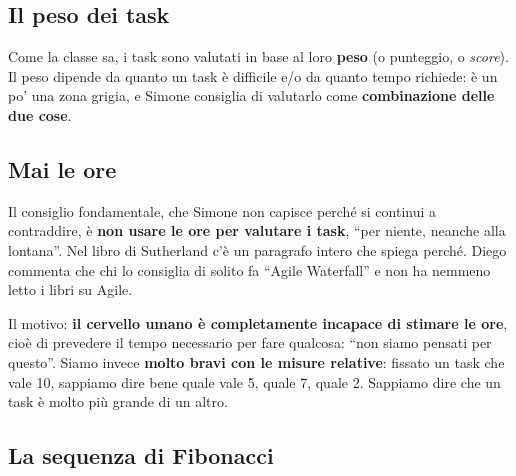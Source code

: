 \subsection{Il peso dei task}

Come la classe sa, i task sono valutati in base al loro \textbf{peso} (o
punteggio, o \emph{score}). Il peso dipende da quanto un task è difficile e/o
da quanto tempo richiede: è un po' una zona grigia, e Simone consiglia di
valutarlo come \textbf{combinazione delle due cose}.

\subsection{Mai le ore}

Il consiglio fondamentale, che Simone non capisce perché si continui a
contraddire, è \textbf{non usare le ore per valutare i task}, ``per niente,
neanche alla lontana''. Nel libro di Sutherland c'è un paragrafo intero che
spiega perché. Diego commenta che chi lo consiglia di solito fa ``Agile
Waterfall'' e non ha nemmeno letto i libri su Agile.

Il motivo: \textbf{il cervello umano è completamente incapace di stimare le
ore}, cioè di prevedere il tempo necessario per fare qualcosa: ``non siamo
pensati per questo''. Siamo invece \textbf{molto bravi con le misure
relative}: fissato un task che vale 10, sappiamo dire bene quale vale 5,
quale 7, quale 2. Sappiamo dire che un task è molto più grande di un altro.

\subsection{La sequenza di Fibonacci}

